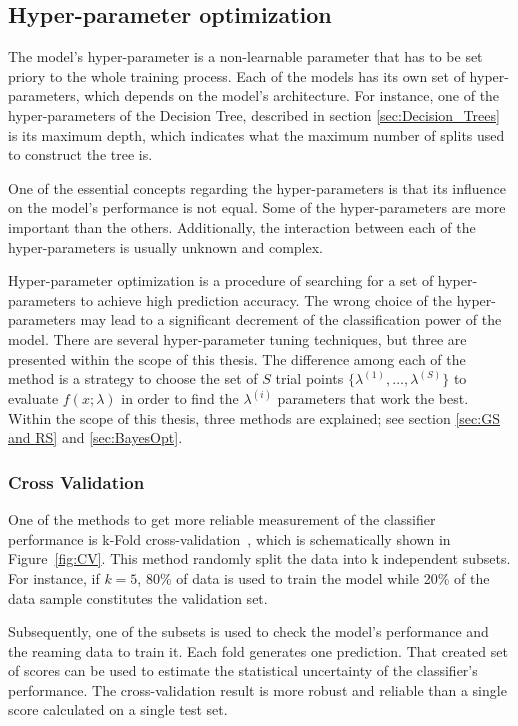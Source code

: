 \subsection{Hyper-parameter optimization}
\label{sec:hyperparameters}

The model's hyper-parameter is a non-learnable parameter that has to be set priory to the whole training process. Each of the models has its own set of hyper-parameters, which depends on the model's architecture. For instance, one of the hyper-parameters of the Decision Tree, described in section \ref{sec:Decision_Trees} is its maximum depth, which indicates what the maximum number of splits used to construct the tree is. 

One of the essential concepts regarding the hyper-parameters is that its influence on the model's performance is not equal. Some of the hyper-parameters are more important than the others. Additionally, the interaction between each of the hyper-parameters is usually unknown and complex. 

Hyper-parameter optimization is a procedure of searching for a set of hyper-parameters to achieve high prediction accuracy. The wrong choice of the hyper-parameters may lead to a significant decrement of the classification power of the model. There are several hyper-parameter tuning techniques, but three are presented within the scope of this thesis. The difference among each of the method is a strategy to choose the set of $S$ trial points $\{\lambda^{(1)}, \ldots , \lambda^{(S)} \}$ to evaluate $f(x;\lambda)$ in order to find the $\lambda^{(i)}$ parameters that work the best. Within the scope of this thesis, three methods are explained; see section \ref{sec:GS and RS} and \ref{sec:BayesOpt}.  

\subsubsection{Cross Validation}
One of the methods to get more reliable measurement of the classifier performance is k-Fold cross-validation~\cite{Statistical_Methods}, which is schematically shown in Figure~\ref{fig:CV}. 
This method randomly split the data into k independent subsets. For instance, if $k = 5$, 80\% of data is used to train the model while 20\% of the data sample constitutes the validation set.   

Subsequently, one of the subsets is used to check the model's performance and the reaming data to train it. Each fold generates one prediction. That created set of scores can be used to estimate the statistical uncertainty of the classifier's performance. The cross-validation result is more robust and reliable than a single score calculated on a single test set.   

